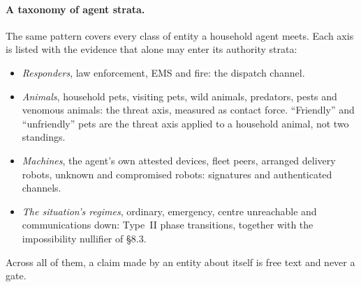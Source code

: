 \paragraph{A taxonomy of agent strata.} The same pattern covers every class of entity a
household agent meets. Each axis is listed with the evidence that alone may enter its authority
strata:
\begin{itemize}
  \item \emph{Responders}, law enforcement, EMS and fire: the dispatch channel.
  \item \emph{Animals}, household pets, visiting pets, wild animals, predators, pests and venomous
        animals: the threat axis, measured as contact force. ``Friendly'' and ``unfriendly'' pets
        are the threat axis applied to a household animal, not two standings.
  \item \emph{Machines}, the agent's own attested devices, fleet peers, arranged delivery robots,
        unknown and compromised robots: signatures and authenticated channels.
  \item \emph{The situation's regimes}, ordinary, emergency, centre unreachable and communications
        down: Type~II phase transitions, together with the impossibility nullifier of \S8.3.
\end{itemize}
Across all of them, a claim made by an entity about itself is free text and never a gate.
